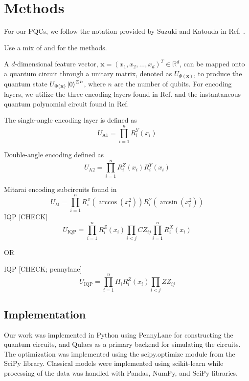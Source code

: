\documentclass[journal=jacsat,manuscript=article]{achemso}
\begin{document}
\section{Methods}
For our PQCs, we follow the notation provided by Suzuki and Katouda in Ref. \citep{suzuki_predicting_2020}. 



Use a mix of  \cite{hatakeyama-sato_quantum_2023} and \cite{suzuki_predicting_2020} for the methods.

A $d$-dimensional feature vector, $\mathbf{x}=(x_{1}, x_{2}, \ldots, x_{d})^{T} \in \mathbb{R}^{d}$, can be mapped onto a quantum circuit through a unitary matrix, denoted as $U_{\Phi(\mathbf{x})}$, to produce the quantum state $U_{\Phi(\mathbf{x})}\ket{0}^{\otimes n}$, where $n$ are the number of qubits.
For encoding layers, we utilize the three encoding layers found in Ref. \citep{suzuki_predicting_2020} and the instantaneous quantum polynomial circuit found in Ref. \citep{bremner_average-case_2016}

The single-angle encoding layer is defined as 
\begin{equation}
	U_{\text{A1}} = \prod_{i=1}^{n} R^{Y}_{i}(x_{i}) 
	\label{eq:A1}
\end{equation}

Double-angle encoding defined as
\begin{equation}
	U_{\text{A2}} = \prod_{i=1}^{n}  R^{Z}_{i}(x_{i}) R^{Y}_{i}(x_{i})
	\label{eq:A2}
\end{equation}

Mitarai encoding subcircuits found in 
\begin{equation}
	U_{\text{M}}  = \prod_{i=1}^{n} R^{Z}_{i}(\arccos (x_{i}^{2})) R^{Y}_{i}(\arcsin (x_{i}^{2}))
	\label{eq:M}
\end{equation}
IQP [CHECK]
\begin{equation}
	U_{\text{IQP}}  = \prod_{i=1}^{n} R^{Z}_{i} (x_{i}) \prod_{i<j} CZ_{ij}  \prod_{i=1}^{n} R^{X}_{i} (x_{i})
\label{eq:IQP}
\end{equation}

OR

IQP [CHECK; pennylane]
\begin{equation}
	U_{\text{IQP}}  = \prod_{i=1}^{n} H_{i} R^{Z}_{i}(x_{i})  \prod_{i<j} ZZ_{ij}
	\label{eq:IQP}
\end{equation}

\subsection{Implementation}
Our work was implemented in Python using PennyLane for constructing the quantum circuits, and Qulacs as a primary backend for simulating the circuits. The optimization was implemented using the scipy.optimize module from the SciPy library. Classical models were implemented using scikit-learn while processing of the data was handled with Pandas, NumPy, and SciPy libraries.  
\end{document}
